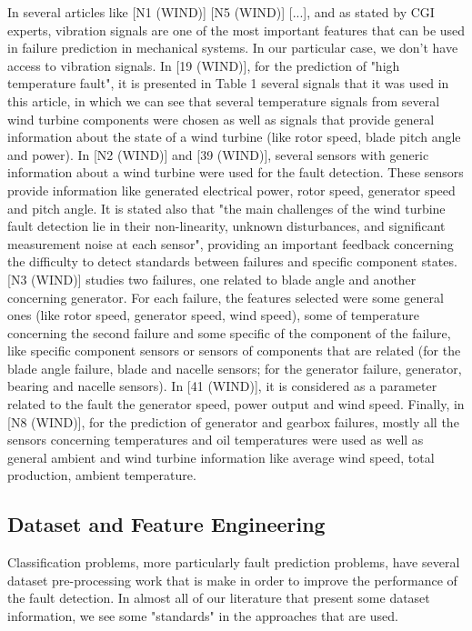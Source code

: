 In several articles like [N1 (WIND)] [N5 (WIND)] [...], and as stated by CGI experts, vibration signals are one of the most important features that can be used in failure prediction in mechanical systems. In our particular case, we don't have access to vibration signals.
In [19 (WIND)], for the prediction of "high temperature fault", it is presented in Table 1 several signals that it was used in this article, in which we can see that several temperature signals from several wind turbine components were chosen as well as signals that provide general information about the state of a wind turbine (like rotor speed, blade pitch angle and power).
In [N2 (WIND)] and [39 (WIND)], several sensors with generic information about a wind turbine were used for the fault detection. These sensors provide information like generated electrical power, rotor speed, generator speed and pitch angle. It is stated also that "the main challenges of the wind turbine fault detection lie in their non-linearity, unknown disturbances, and significant measurement noise at each sensor", providing an important feedback concerning the difficulty to detect standards between failures and specific component states.
[N3 (WIND)] studies two failures, one related to blade angle and another concerning generator. For each failure, the features selected were some general ones (like rotor speed, generator speed, wind speed), some of temperature concerning the second failure and some specific of the component of the failure, like specific component sensors or sensors of components that are related (for the blade angle failure, blade and nacelle sensors; for the generator failure, generator, bearing and nacelle sensors).
In [41 (WIND)], it is considered as a parameter related to the fault the generator speed, power output and wind speed.
Finally, in [N8 (WIND)], for the prediction of generator and gearbox failures, mostly all the sensors concerning temperatures and oil temperatures were used as well as general ambient and wind turbine information like average wind speed, total production, ambient temperature.


\subsection{Dataset and Feature Engineering}

Classification problems, more particularly fault prediction problems, have several dataset pre-processing work that is make in order to improve the performance of the fault detection. In almost all of our literature that present some dataset information, we see some "standards" in the approaches that are used.

